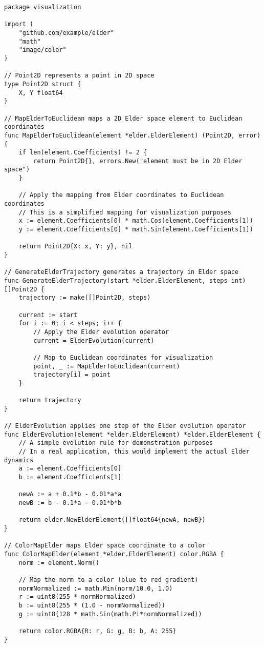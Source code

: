 \begin{lstlisting}[language=golang, caption={Elder Space Visualization Utility}]
package visualization

import (
    "github.com/example/elder"
    "math"
    "image/color"
)

// Point2D represents a point in 2D space
type Point2D struct {
    X, Y float64
}

// MapElderToEuclidean maps a 2D Elder space element to Euclidean coordinates
func MapElderToEuclidean(element *elder.ElderElement) (Point2D, error) {
    if len(element.Coefficients) != 2 {
        return Point2D{}, errors.New("element must be in 2D Elder space")
    }
    
    // Apply the mapping from Elder coordinates to Euclidean coordinates
    // This is a simplified mapping for visualization purposes
    x := element.Coefficients[0] * math.Cos(element.Coefficients[1])
    y := element.Coefficients[0] * math.Sin(element.Coefficients[1])
    
    return Point2D{X: x, Y: y}, nil
}

// GenerateElderTrajectory generates a trajectory in Elder space
func GenerateElderTrajectory(start *elder.ElderElement, steps int) []Point2D {
    trajectory := make([]Point2D, steps)
    
    current := start
    for i := 0; i < steps; i++ {
        // Apply the Elder evolution operator
        current = ElderEvolution(current)
        
        // Map to Euclidean coordinates for visualization
        point, _ := MapElderToEuclidean(current)
        trajectory[i] = point
    }
    
    return trajectory
}

// ElderEvolution applies one step of the Elder evolution operator
func ElderEvolution(element *elder.ElderElement) *elder.ElderElement {
    // A simple evolution rule for demonstration purposes
    // In a real application, this would implement the actual Elder dynamics
    a := element.Coefficients[0]
    b := element.Coefficients[1]
    
    newA := a + 0.1*b - 0.01*a*a
    newB := b - 0.1*a - 0.01*b*b
    
    return elder.NewElderElement([]float64{newA, newB})
}

// ColorMapElder maps Elder space coordinate to a color
func ColorMapElder(element *elder.ElderElement) color.RGBA {
    norm := element.Norm()
    
    // Map the norm to a color (blue to red gradient)
    normNormalized := math.Min(norm/10.0, 1.0)
    r := uint8(255 * normNormalized)
    b := uint8(255 * (1.0 - normNormalized))
    g := uint8(128 * math.Sin(math.Pi*normNormalized))
    
    return color.RGBA{R: r, G: g, B: b, A: 255}
}
\end{lstlisting}
